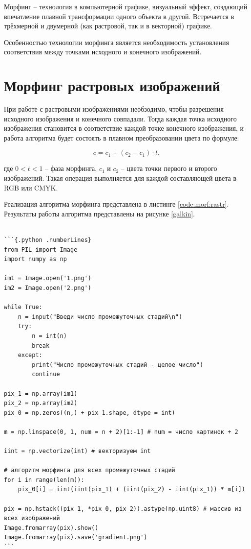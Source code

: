 \documentclass[]{article}
\begin{document}
Морфинг -- технология в компьютерной графике, визуальный эффект, создающий впечатление плавной трансформации одного объекта в другой. Встречается в трёхмерной и двумерной (как растровой, так и в векторной) графике.

Особенностью технологии морфинга является необходимость установления соответствия между точками исходного и конечного изображений.

\hypertarget{morf:rastr}{%
\section{Морфинг растровых изображений}\label{morf:rastr}}

При работе с растровыми изображениями необзодимо, чтобы разрешения исходного изображения и конечного совпадали. Тогда каждая точка исходного изображения становится в соответствие каждой точке конечного изображения, и работа алгоритма будет состоять в плавном преобразовании цвета по формуле:

\begin{equation}
  \label{morf:1}
  c = c_1 + (c_2 - c_1) \cdot t,
\end{equation}

\noindent где \(0<t<1\) -- фаза морфинга, \(c_1\) и \(c_2\) -- цвета точки первого и второго изображений. Такая операция выполняется для каждой составляющей цвета в RGB или CMYK.

Реализация алгоритма морфинга представлена в листинге \ref{code:morf:rastr}. Результаты работы алгоритма представлены на рисунке \ref{galkin}.

\begin{lstlisting}[caption = Реализация алгоритма морфинга для растровых изображений, label = code:morf:rastr]

```{.python .numberLines}
from PIL import Image
import numpy as np

im1 = Image.open('1.png')
im2 = Image.open('2.png')

while True:
    n = input("Введи число промежуточных стадий\n")
    try:
        n = int(n)
        break
    except:
        print("Число промежуточных стадий - целое число")
        continue

pix_1 = np.array(im1)
pix_2 = np.array(im2)
pix_0 = np.zeros((n,) + pix_1.shape, dtype = int)

m = np.linspace(0, 1, num = n + 2)[1:-1] # num = число картинок + 2

iint = np.vectorize(int) # векторизуем int

# алгоритм морфинга для всех промежуточных стадий
for i in range(len(m)):
    pix_0[i] = iint(iint(pix_1) + (iint(pix_2) - iint(pix_1)) * m[i])
    
pix = np.hstack((pix_1, *pix_0, pix_2)).astype(np.uint8) # массив из всех изображений
Image.fromarray(pix).show()
Image.fromarray(pix).save('gradient.png')
```
\end{lstlisting}
\end{document}
